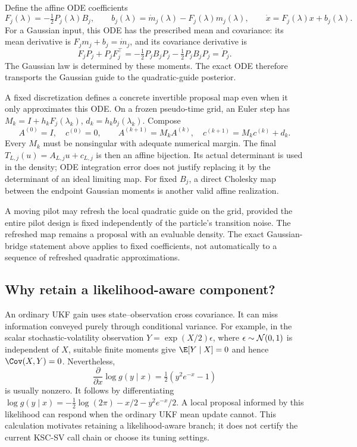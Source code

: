 Define the affine ODE coefficients
\begin{equation}
\label{eq:bf-covariance-proposal-local-ode}
 F_j(\lambda)=-\tfrac12P_j(\lambda)B_j,\qquad
 b_j(\lambda)=\dot m_j(\lambda)-F_j(\lambda)m_j(\lambda),
 \qquad \dot x=F_j(\lambda)x+b_j(\lambda).
\end{equation}
For a Gaussian input, this ODE has the prescribed mean and covariance:
its mean derivative is \(F_jm_j+b_j=\dot m_j\), and its covariance
derivative is
\[
 F_jP_j+P_jF_j^\top
 =-\tfrac12P_jB_jP_j-\tfrac12P_jB_jP_j
 =\dot P_j .
\]
The Gaussian law is determined by these moments. The exact ODE therefore
transports the Gaussian guide to the quadratic-guide posterior.

A fixed discretization defines a concrete invertible proposal map even
when it only approximates this ODE. On a frozen pseudo-time grid, an Euler
step has \(M_k=I+h_kF_j(\lambda_k)\), \(d_k=h_kb_j(\lambda_k)\).
Compose
\begin{equation}
\label{eq:bf-covariance-proposal-affine-composition}
 A^{(0)}=I,\quad c^{(0)}=0,\qquad
 A^{(k+1)}=M_kA^{(k)},\quad
 c^{(k+1)}=M_kc^{(k)}+d_k .
\end{equation}
Every \(M_k\) must be nonsingular with adequate numerical margin.
The final \(T_{L,j}(u)=A_{L,j}u+c_{L,j}\) is then an affine bijection.
Its actual determinant is used in the density; ODE integration error
does not justify replacing it by the determinant of an ideal limiting map.
For fixed \(B_j\), a direct Cholesky map between the endpoint Gaussian
moments is another valid affine realization.

A moving pilot may refresh the local quadratic guide on the grid, provided
the entire pilot design is fixed independently of the particle's transition
noise. The refreshed map remains a proposal with an evaluable density.
The exact Gaussian-bridge statement above applies to fixed coefficients,
not automatically to a sequence of refreshed quadratic approximations.

\subsection{Why retain a likelihood-aware component?}

An ordinary UKF gain uses state--observation cross covariance. It can miss
information conveyed purely through conditional variance. For example, in
the scalar stochastic-volatility observation
\(Y=\exp(X/2)\epsilon\), where \(\epsilon\sim\mathcal N(0,1)\) is independent
of \(X\), suitable finite moments give
\(\E[Y\mid X]=0\) and hence \(\Cov(X,Y)=0\).
Nevertheless,
\begin{equation}
\label{eq:bf-covariance-proposal-sv-score}
 \frac{\partial}{\partial x}\log g(y\mid x)
 =\tfrac12(y^2e^{-x}-1)
\end{equation}
is usually nonzero. It follows by differentiating
\(\log g(y\mid x)=-\tfrac12\log(2\pi)-x/2-y^2e^{-x}/2\).
A local proposal informed by this likelihood can respond when the
ordinary UKF mean update cannot. This calculation motivates retaining a
likelihood-aware branch; it does not certify the current KSC-SV call chain
or choose its tuning settings.

